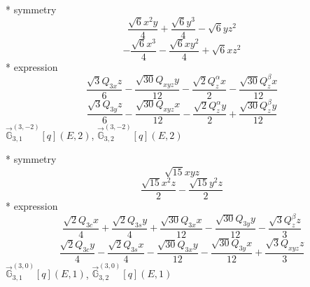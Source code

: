 \documentclass[fleqn,8pt]{jsarticle}
\begin{document}
\noindent\quad ** symmetry
\begin{dmath*}
\frac{\sqrt{6} x^{2} y}{4} + \frac{\sqrt{6} y^{3}}{4} - \sqrt{6} y z^{2}
\end{dmath*}
\begin{dmath*}
- \frac{\sqrt{6} x^{3}}{4} - \frac{\sqrt{6} x y^{2}}{4} + \sqrt{6} x z^{2}
\end{dmath*}
\noindent\quad ** expression
\begin{dmath*}
\frac{\sqrt{3} Q_{3x} z}{6} - \frac{\sqrt{30} Q_{xyz} y}{12} - \frac{\sqrt{2} Q_{z}^{\alpha} x}{2} - \frac{\sqrt{30} Q_{z}^{\beta} x}{12}
\end{dmath*}
\begin{dmath*}
\frac{\sqrt{3} Q_{3y} z}{6} - \frac{\sqrt{30} Q_{xyz} x}{12} - \frac{\sqrt{2} Q_{z}^{\alpha} y}{2} + \frac{\sqrt{30} Q_{z}^{\beta} y}{12}
\end{dmath*}
\noindent\quad $\vec{\mathbb{G}}_{3,1}^{(3,-2)}[q](E,2)$, $\vec{\mathbb{G}}_{3,2}^{(3,-2)}[q](E,2)$

\noindent\quad ** symmetry
\begin{dmath*}
\sqrt{15} x y z
\end{dmath*}
\begin{dmath*}
\frac{\sqrt{15} x^{2} z}{2} - \frac{\sqrt{15} y^{2} z}{2}
\end{dmath*}
\noindent\quad ** expression
\begin{dmath*}
\frac{\sqrt{2} Q_{3c} x}{4} + \frac{\sqrt{2} Q_{3s} y}{4} + \frac{\sqrt{30} Q_{3x} x}{12} - \frac{\sqrt{30} Q_{3y} y}{12} - \frac{\sqrt{3} Q_{z}^{\beta} z}{3}
\end{dmath*}
\begin{dmath*}
\frac{\sqrt{2} Q_{3c} y}{4} - \frac{\sqrt{2} Q_{3s} x}{4} - \frac{\sqrt{30} Q_{3x} y}{12} - \frac{\sqrt{30} Q_{3y} x}{12} + \frac{\sqrt{3} Q_{xyz} z}{3}
\end{dmath*}
\noindent\quad $\vec{\mathbb{G}}_{3,1}^{(3,0)}[q](E,1)$, $\vec{\mathbb{G}}_{3,2}^{(3,0)}[q](E,1)$
\end{document}
